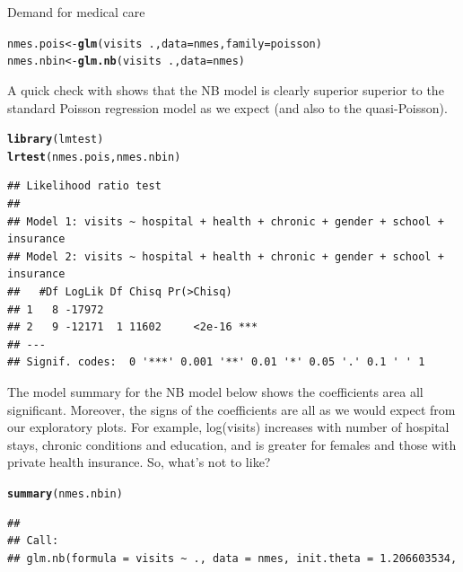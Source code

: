 \documentclass[11pt]{book}\usepackage[]{graphicx}\usepackage[]{color}
\makeatletter
\newcommand{\hlopt}[1]{\textcolor[rgb]{0,0,0}{#1}}%
\newcommand{\hlstd}[1]{\textcolor[rgb]{0.345,0.345,0.345}{#1}}%
\newcommand{\hlkwb}[1]{\textcolor[rgb]{0.69,0.353,0.396}{#1}}%
\newcommand{\hlkwc}[1]{\textcolor[rgb]{0.333,0.667,0.333}{#1}}%
\newcommand{\hlkwd}[1]{\textcolor[rgb]{0.737,0.353,0.396}{\textbf{#1}}}%
\newenvironment{kframe}{%
 \def\at@end@of@kframe{}%
 \ifinner\ifhmode%
  \def\at@end@of@kframe{\end{minipage}}%
  \begin{minipage}{\columnwidth}%
 \fi\fi%
 \def\FrameCommand##1{\hskip\@totalleftmargin \hskip-\fboxsep
 \colorbox{shadecolor}{##1}\hskip-\fboxsep
     \hskip-\linewidth \hskip-\@totalleftmargin \hskip\columnwidth}%
 \MakeFramed {\advance\hsize-\width
   \@totalleftmargin\z@ \linewidth\hsize
   \@setminipage}}%
 {\par\unskip\endMakeFramed%
 \at@end@of@kframe}
\newenvironment{knitrout}{}{} %
\renewenvironment{knitrout}{\small\renewcommand{\baselinestretch}{.85}}{} %
\makeatother
\begin{document}
\begin{Example}[nmes2]{Demand for medical care}
\begin{knitrout}
\color{fgcolor}\begin{kframe}
\begin{alltt}
\hlstd{nmes.pois}   \hlkwb{<-}      \hlkwd{glm}\hlstd{(visits} \hlopt{~} \hlstd{.,} \hlkwc{data} \hlstd{= nmes,} \hlkwc{family} \hlstd{= poisson)}
\hlstd{nmes.nbin}   \hlkwb{<-}   \hlkwd{glm.nb}\hlstd{(visits} \hlopt{~} \hlstd{.,} \hlkwc{data} \hlstd{= nmes)}
\end{alltt}
\end{kframe}
\end{knitrout}
A quick check with  shows that the NB model is clearly superior
superior to the standard Poisson regression model as we expect
(and also to the quasi-Poisson).
\begin{knitrout}
\color{fgcolor}\begin{kframe}
\begin{alltt}
\hlkwd{library}\hlstd{(lmtest)}
\hlkwd{lrtest}\hlstd{(nmes.pois, nmes.nbin)}
\end{alltt}
\begin{verbatim}
## Likelihood ratio test
## 
## Model 1: visits ~ hospital + health + chronic + gender + school + insurance
## Model 2: visits ~ hospital + health + chronic + gender + school + insurance
##   #Df LogLik Df Chisq Pr(>Chisq)    
## 1   8 -17972                        
## 2   9 -12171  1 11602     <2e-16 ***
## ---
## Signif. codes:  0 '***' 0.001 '**' 0.01 '*' 0.05 '.' 0.1 ' ' 1
\end{verbatim}
\end{kframe}
\end{knitrout}
The model summary for the NB model below shows the coefficients area all significant.
Moreover, the signs of the coefficients are all as we would expect from our
exploratory plots. For example, log(visits) increases with number of hospital
stays, chronic conditions and education, and is greater for females and
those with private health insurance.  So, what's not to like?
\begin{knitrout}
\color{fgcolor}\begin{kframe}
\begin{alltt}
\hlkwd{summary}\hlstd{(nmes.nbin)}
\end{alltt}
\begin{verbatim}
## 
## Call:
## glm.nb(formula = visits ~ ., data = nmes, init.theta = 1.206603534, 

\end{verbatim}
\end{kframe}
\end{knitrout}
\end{Example}
\end{document}
